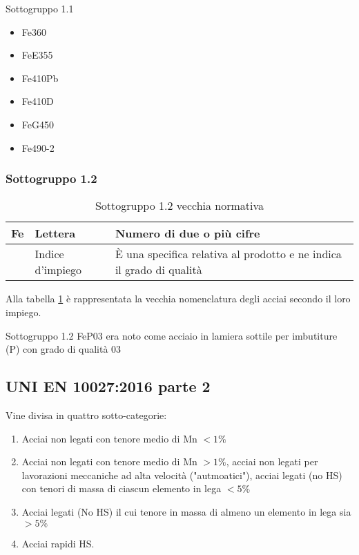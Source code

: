 \begin{example}{Sottogruppo 1.1}
\begin{multicols}{3}
\begin{itemize}
\item Fe360
\item FeE355
\columnbreak
\item Fe410Pb
\item Fe410D
\columnbreak
\item FeG450
\item Fe490-2
\end{itemize}
\end{multicols}
\end{example}

\subsubsection*{Sottogruppo 1.2}
\begin{table}
\centering
\caption{Sottogruppo 1.2 vecchia normativa}\label{tab:OldLaw1.2}
\begin{tabularx}{\textwidth}{|c|X|X|}
\toprule
\textbf{Fe} & \textbf{Lettera} & \textbf{Numero di due o più cifre}\\
\midrule
&
Indice d'impiego
&
È una specifica relativa al prodotto e ne indica il grado di qualità\\
\bottomrule
\end{tabularx}
\end{table}
Alla tabella \ref{tab:OldLaw1.2} è rappresentata la vecchia nomenclatura degli acciai secondo il loro impiego.

\begin{example}{Sottogruppo 1.2}
FeP03 era noto come acciaio in lamiera sottile per imbutiture (P) con grado di qualità 03
\end{example}

\subsection{UNI EN 10027:2016 parte 2}
Vine divisa in quattro sotto-categorie:
\begin{enumerate}
\item Acciai non legati con tenore medio di Mn $<1\%$
\item Acciai non legati con tenore medio di Mn $>1\%$, acciai non legati per lavorazioni meccaniche ad alta velocità ("autmoatici"), acciai legati (no HS) con tenori di massa di ciascun elemento in lega $<5\%$
\item Acciai legati (No HS) il cui tenore in massa di almeno un elemento in lega sia $>5\%$
\item Acciai rapidi HS.
\end{enumerate}


